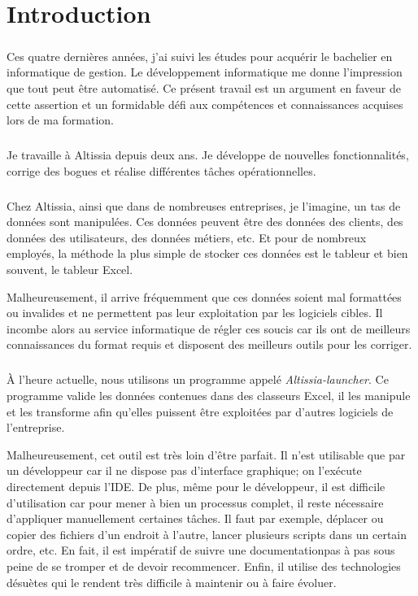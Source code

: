 \chapter{Introduction}
\label{ch:introduction}

\paragraph{}
Ces quatre dernières années, j'ai suivi les études pour acquérir le bachelier en informatique de gestion.
Le développement informatique me donne l'impression que tout peut être automatisé.
Ce présent travail est un argument en faveur de cette assertion et un formidable défi aux compétences et connaissances acquises lors de ma formation.

\paragraph{}
Je travaille à Altissia depuis deux ans.
Je développe de nouvelles fonctionnalités, corrige des bogues et réalise différentes tâches opérationnelles.

\paragraph{}
Chez Altissia, ainsi que dans de nombreuses entreprises, je l'imagine, un tas de données sont manipulées.
Ces données peuvent être des données des clients, des données des utilisateurs, des données métiers, etc.
Et pour de nombreux employés, la méthode la plus simple de stocker ces données est le tableur et bien souvent, le tableur Excel.

Malheureusement, il arrive fréquemment que ces données soient mal formattées ou invalides et ne permettent pas leur exploitation par les logiciels cibles.
Il incombe alors au service informatique de régler ces soucis car ils ont de meilleurs connaissances du format requis et disposent des meilleurs outils pour les corriger.

\paragraph{}
À l'heure actuelle, nous utilisons un programme appelé \textit{Altissia-launcher}.
Ce programme valide les données contenues dans des classeurs Excel, il les manipule et les transforme afin qu'elles puissent être exploitées par d'autres logiciels de l'entreprise.

Malheureusement, cet outil est très loin d'être parfait.
Il n'est utilisable que par un développeur car il ne dispose pas d'interface graphique; on l'exécute directement depuis l'IDE\fnmark.
De plus, même pour le développeur, il est difficile d'utilisation car pour mener à bien un processus complet, il reste nécessaire d'appliquer manuellement certaines tâches.
Il faut par exemple, déplacer ou copier des fichiers d'un endroit à l'autre, lancer plusieurs scripts dans un certain ordre, etc.
En fait, il est impératif de suivre une documentation\fnmark pas à pas sous peine de se tromper et de devoir recommencer.
Enfin, il utilise des technologies désuètes qui le rendent très difficile à maintenir ou à faire évoluer.

